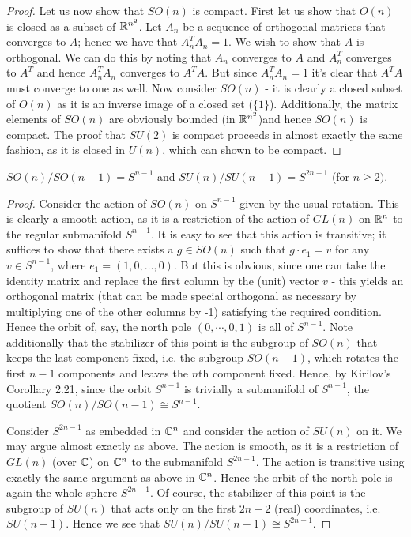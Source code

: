 \documentclass{../../mathnotes}
\begin{document}
\begin{proof}
    Let us now show that $SO(n)$ is compact. First let us show that $O(n)$ is closed as a subset of $\mathbb{R}^{n^2}$. 
    Let $A_n$ be a sequence of orthogonal matrices that converges to $A$; hence we have that $A_n^TA_n=1$. We wish to show that $A$ is orthogonal.
    We can do this by noting that $A_n$ converges to $A$ and $A_n^T$ converges to $A^T$ and hence $A_n^TA_n$ converges to $A^TA$. But since
    $A_n^TA_n=1$ it's clear that $A^TA$ must converge to one as well. Now consider $SO(n)$ - it is clearly a closed subset of $O(n)$ as it is
    an inverse image of a closed set ($\{1\}$). Additionally, the matrix elements of $SO(n)$ are obviously bounded (in $\mathbb{R}^{n^2}$)and hence $SO(n)$ is 
    compact. The proof that $SU(2)$ is compact proceeds in almost exactly the same fashion, as it is closed in $U(n)$, which can shown to be compact.
\end{proof}

\begin{prop}
    $SO(n)/SO(n-1)=S^{n-1}$ and $SU(n)/SU(n-1)=S^{2n-1}$ (for $n\geq 2)$.
\end{prop}
\begin{proof}
    Consider the action of $SO(n)$ on $S^{n-1}$ given by the usual rotation. This is clearly a smooth action, as it is a restriction
    of the action of $GL(n)$ on $\mathbb{R}^n$ to the regular submanifold $S^{n-1}$. 
    It is easy to see that this action is transitive; it suffices to show that there exists a $g\in SO(n)$ such that $g\cdot e_1=v$
    for any $v\in S^{n-1}$, where $e_1=(1,0,\ldots,0)$. But this is obvious, since one can take the identity matrix and replace the first column
    by the (unit) vector $v$ - this yields an orthogonal matrix (that can be made special orthogonal as necessary by multiplying one of the
    other columns by -1) satisfying the required condition. Hence the orbit of, say, the north pole $(0,\cdots,0,1)$ is all of $S^{n-1}$.
    Note additionally that the stabilizer of
    this point is the subgroup of $SO(n)$ that keeps the last component fixed, i.e. the subgroup $SO(n-1)$, which rotates the first $n-1$ components
    and leaves the $n$th component fixed. Hence, by Kirilov's Corollary 2.21, since the orbit $S^{n-1}$ is trivially a submanifold of $S^{n-1}$,
    the quotient $SO(n)/SO(n-1)\cong S^{n-1}$.

    Consider $S^{2n-1}$ as embedded in $\mathbb{C}^n$ and consider the action of $SU(n)$ on it. We may argue almost exactly as above. The action is smooth,
    as it is a restriction of $GL(n)$ (over $\mathbb{C}$) on $\mathbb{C}^n$ to the submanifold $S^{2n-1}$. The action is transitive using exactly the same
    argument as above in $\mathbb{C}^n$. Hence the orbit of the north pole is again the whole sphere $S^{2n-1}$. Of course, the stabilizer of this point
    is the subgroup of $SU(n)$ that acts only on the first $2n-2$ (real) coordinates, i.e. $SU(n-1)$. Hence we see that $SU(n)/SU(n-1)\cong S^{2n-1}$.
\end{proof}
\end{document}
